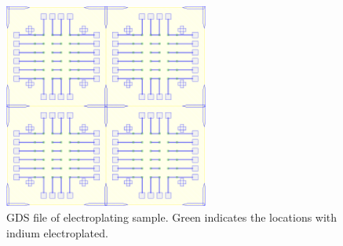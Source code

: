 \begin{figure}
    \centering
    \includegraphics[width=0.6\textwidth]{Main/Ch2/DC_DieBTest_V2.GDStex_output.pdf}
    \caption{GDS file of electroplating sample. Green indicates the locations with indium electroplated. }
\end{figure}



